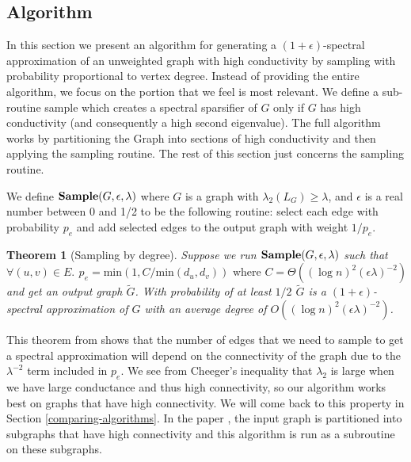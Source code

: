 \documentclass[12pt,twoside]{article}
\newtheorem{thm}{Theorem}
\begin{document}
\subsection{Algorithm}

In this section we present an algorithm for generating a $(1+\epsilon)$-spectral approximation of an unweighted graph with high conductivity by sampling with probability proportional to vertex degree. Instead of providing the entire algorithm, we focus on the portion that we feel is most relevant. We define a sub-routine sample which creates a spectral sparsifier of $G$ only if $G$ has high conductivity (and consequently a high second eigenvalue). The full algorithm works by partitioning the Graph into sections of high conductivity and then applying the sampling routine. The rest of this section just concerns the sampling routine.


We define $\text{\textbf{Sample}}(G, \epsilon, \lambda)$ where $G$ is a graph with $\lambda_2(L_G) \geq \lambda$, and $\epsilon$ is a real number between 0 and 1/2 to be the following routine: select each edge with probability $p_e$ and add selected edges to the output graph with weight $1/p_e$. 

\begin{thm}[Sampling by degree]
\label{thm:sample-by-degree}
Suppose we run $\normalfont{\textbf{Sample}}(G, \epsilon, \lambda)$ such that
%
\begin{equation*}
\forall (u,v) \in E.\:\, p_e = \text{min}(1, C/\text{min}(d_u, d_v)) \text{ where } C=\Theta((\log n)^2 (\epsilon\lambda)^{-2})
\end{equation*}
%
and get an output graph $\tilde{G}$.  With probability of at least $1/2$ $\tilde{G}$ is a $(1+\epsilon)$-spectral approximation of $G$ with an average degree of $O((\log n)^2 (\epsilon \lambda)^{-2})$. 
\end{thm}

This theorem from \cite{microsoft-summary} shows that the number of edges that we need to sample to get a spectral approximation will depend on the connectivity of the graph due to the $\lambda^{-2}$ term included in $p_e$. We see from Cheeger's inequality that $\lambda_2$ is large when we have large conductance and thus high connectivity, so our algorithm works best on graphs that have high connectivity. We will come back to this property in Section \ref{comparing-algorithms}. In the paper \cite{spielman-teng-spectralsparse}, the input graph is partitioned into subgraphs that have high connectivity and this algorithm is run as a subroutine on these subgraphs.
\end{document}
